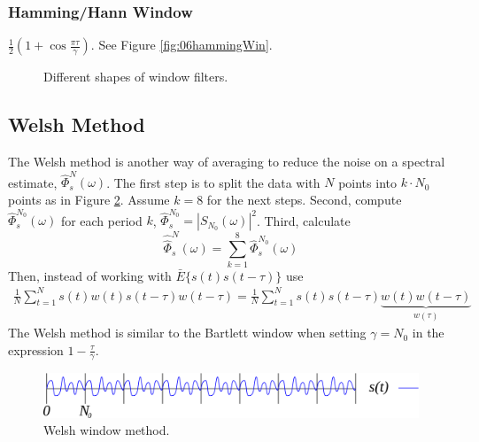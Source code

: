 \documentclass[lecture,12pt,]{pcms-l}
\theoremstyle{example}
\newcommand{\w}{\omega}
\begin{document}
\subsubsection{Hamming/Hann Window}
$\frac{1}{2}\left(1+\cos\frac{\pi\tau}{\gamma}\right)$. See Figure \ref{fig:06hammingWin}.

\begin{figure}[ht!]
	\centering
	 \hfill
	 \hfill
	\caption{Different shapes of window filters.}
	\label{fig:06filterShapes}
\end{figure}

\subsection{Welsh Method}
The Welsh method is another way of averaging to reduce the noise on a spectral estimate, $\hat{\Phi}_s^N(\w)$. The first step is to split the data with $N$ points into $k\cdot N_0$ points as in Figure \ref{fig:06welsh}. Assume $k=8$ for the next steps. Second, compute $\hat{\Phi}_s^{N_0}(\w)$ for each period $k$, $\hat{\Phi}_s^{N_0} = |S_{N_0}(\w)|^2$. Third, calculate
$$\hat{\hat{\Phi}}_s^N(\w) = \sum_{k=1}^8 \hat{\Phi}_s^{N_0}(\w)$$
Then, instead of working with $\bar{E}\{s(t)s(t-\tau)\}$ use
\begin{align*}
\frac{1}{N}\sum_{t=1}^Ns(t)w(t)s(t-\tau)w(t-\tau) =
\frac{1}{N}\sum_{t=1}^Ns(t)s(t-\tau) \underbrace{w(t)w(t-\tau)}_{w(\tau)}
\end{align*}
The Welsh method is similar to the Bartlett window when setting $\gamma=N_0$ in the expression $1-\frac{\tau}{\gamma}$.

\begin{figure}[ht!]
	\centering
	\includegraphics[width=.5\textwidth]{images/06welsh}
	\caption{Welsh window method.}
	\label{fig:06welsh}
\end{figure}
\end{document}
